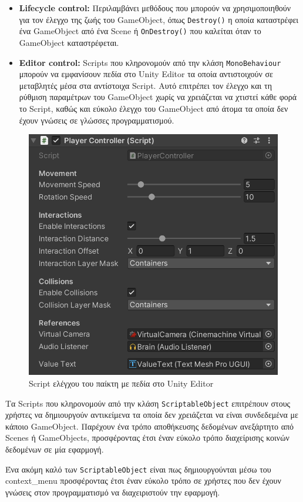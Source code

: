 \begin{itemize}
    \item \textbf{Lifecycle control:} Περιλαμβάνει μεθόδους που μπορούν να χρησιμοποιηθούν για τον έλεγχο της ζωής του GameObject, όπως \verb|Destroy()| η οποία καταστρέφει ένα GameObject από ένα Scene ή \verb|OnDestroy()| που καλείται όταν το GameObject καταστρέφεται.
    \item \textbf{Editor control:} Scripts που κληρονομούν από την κλάση \verb|MonoBehaviour| μπορούν να εμφανίσουν πεδία στο Unity Editor τα οποία αντιστοιχούν σε μεταβλητές μέσα στα αντίστοιχα Script. Αυτό επιτρέπει τον έλεγχο και τη ρύθμιση παραμέτρων του GameObject χωρίς να χρειάζεται να χτιστεί κάθε φορά το Script, καθώς και εύκολο έλεγχο του GameObject από άτομα τα οποία δεν έχουν γνώσεις σε γλώσσες προγραμματισμού.
\end{itemize}

\begin{figure}[H]
    \centering
    \includegraphics[width=0.6\linewidth]{sections/4/1/images/unity_editor_player_controller}
    \caption{Script ελέγχου του παίκτη με πεδία στο Unity Editor}
    \label{fig:unity_editor_player_controller}
\end{figure}

Τα Scripts που κληρονομούν από την κλάση \verb|ScriptableObject| επιτρέπουν στους χρήστες να δημιουργούν αντικείμενα τα οποία δεν χρειάζεται να είναι συνδεδεμένα με κάποιο GameObject. Παρέχουν ένα τρόπο αποθήκευσης δεδομένων ανεξάρτητο από Scenes ή GameObjects, προσφέροντας έτσι έναν εύκολο τρόπο διαχείρισης κοινών δεδομένων σε μία εφαρμογή.

Ένα ακόμη καλό των \verb|ScriptableObject| είναι πως δημιουργούνται μέσω του \gls{context_menu} προσφέροντας έτσι έναν εύκολο τρόπο σε χρήστες που δεν έχουν γνώσεις στον προγραμματισμό να διαχειριστούν την εφαρμογή.

